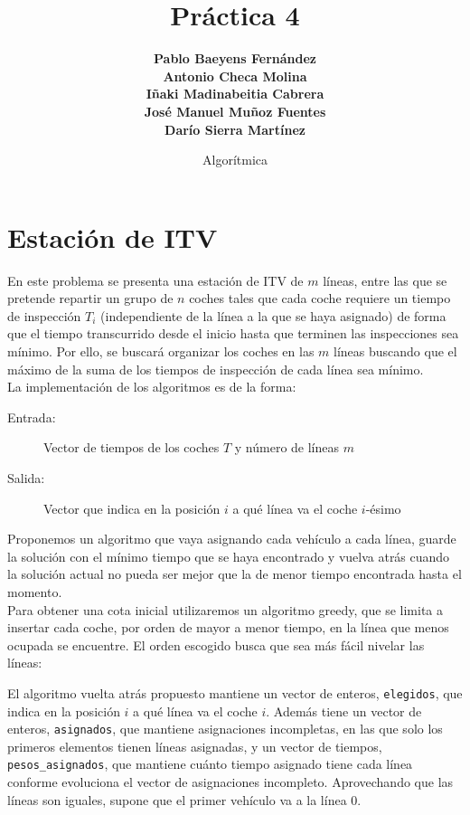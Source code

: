 \documentclass[a4paper, 11pt]{article}
\title{\Huge \textbf{Práctica 4}}
\author{\textbf{Pablo Baeyens Fernández} \\ \textbf{Antonio Checa Molina} \\
	\textbf{Iñaki Madinabeitia Cabrera} \\  \textbf{José Manuel Muñoz Fuentes} \\
	\textbf{Darío Sierra Martínez} \\ }
\date{Algorítmica}
\begin{document}
	\maketitle
	\tableofcontents
	\newpage

\section{Estación de ITV}

En este problema se presenta una estación de ITV de $m$ líneas, entre las que
se pretende repartir un grupo de $n$ coches tales que cada coche requiere un
tiempo de inspección $T_i$ (independiente de la línea a la que se haya asignado)
de forma que el tiempo transcurrido desde el inicio hasta que terminen las
inspecciones sea mínimo. Por ello, se buscará organizar los coches en las $m$
líneas buscando que el máximo de la suma de los tiempos de inspección de cada
línea sea mínimo. \\

La implementación de los algoritmos es de la forma:
\begin{description}
	\item[Entrada:] Vector de tiempos de los coches $T$ y número de líneas $m$
	\item[Salida:] Vector que indica en la posición $i$ a qué línea va el coche $i$-ésimo
\end{description}

Proponemos un algoritmo que vaya asignando cada vehículo a cada línea, guarde la solución con el mínimo tiempo que se haya encontrado y vuelva atrás cuando la solución actual no pueda ser mejor que la de menor tiempo encontrada hasta el momento. \\

Para obtener una cota inicial utilizaremos un algoritmo greedy, que se limita a insertar cada coche, por orden de mayor a menor tiempo, en la línea que menos ocupada se encuentre. El orden escogido busca que sea más fácil nivelar las líneas:


El algoritmo vuelta atrás propuesto mantiene un vector de enteros, \texttt{elegidos}, que indica en la posición $i$ a qué línea va el coche $i$. Además tiene un vector de enteros, \texttt{asignados}, que mantiene asignaciones incompletas, en las que solo los primeros elementos tienen líneas asignadas, y un vector de tiempos, \texttt{pesos\_asignados}, que mantiene cuánto tiempo asignado tiene cada línea conforme evoluciona el vector de asignaciones incompleto. Aprovechando que las líneas son iguales, supone que el primer vehículo va a la línea 0.
\end{document}
